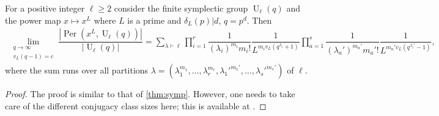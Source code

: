 \documentclass[11pt,twoside]{amsart}
\newcommand{\per}{\operatorname{Per}}
\newcommand{\Un}{\operatorname{U}}
\theoremstyle{definition} %
\begin{document}
\begin{theorem}\label{thm:unitary}
    For a positive integer $\ell\geq 2$ consider the finite symplectic group $\Un_{\ell}(q)$ and the power map $x\mapsto x^L$ where $L$ is a prime and $\delta_L(p)|d$, $q=p^d$. Then 
    \begin{align*}
        \lim\limits_{\substack{q\longrightarrow\infty\\v_L(q-1)=c}}\dfrac{|\per(x^L,\Un_{\ell}(q))|}{|\Un_{\ell}(q)|}= \sum\limits_{\lambda\vdash \ell}\prod\limits_{i=1}^r\dfrac{1}{(\lambda_i)^{m_i}m_i!}\dfrac{1}{L^{m_iv_L(q^{\lambda_i}+1)}}\prod\limits_{a=1}^{s}\dfrac{1}{(\lambda_a')^{m_a'}m_a'!}\dfrac{1}{L^{m_a'v_L(q^{\lambda_i'}-1)}},
    \end{align*}
    where the sum runs over all partitions $\lambda=(\lambda_1^{m_1},\ldots,\lambda_r^{m_r},\lambda_1'^{m_1'},\ldots,\lambda_s'^{m_s'})$ of $\ell$.
\end{theorem}
\begin{proof}
    The proof is similar to that of \cref{thm:symp}. 
    However, one needs to take care of the different conjugacy class sizes here; this is available at \cite[page 34]{Wall1963}.
\end{proof}
\printbibliography
\vspace{2em}
\end{document}
